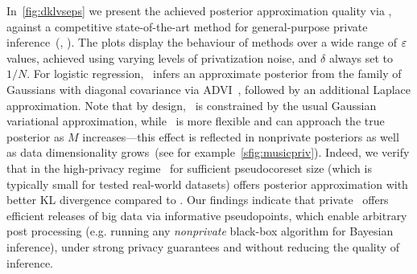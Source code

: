 In~\cref{fig:dklvseps} we present the achieved posterior approximation quality via \dpsvi, against a competitive state-of-the-art method for general-purpose private inference~(\dpvi, \cite{jalko17}). The plots display the
behaviour of methods over a wide range of $\varepsilon$ values, achieved using varying levels of privatization noise, and $\delta$ always set to $1/N$. For logistic regression, \dpvi~infers an approximate posterior from the family of Gaussians with diagonal covariance via ADVI~\citep{kucukelbir17}, followed by an additional Laplace approximation. Note that by design, \dpvi~is constrained by the usual Gaussian variational approximation, while \dpsvi~is more flexible and can approach the true posterior as $ M $ increases---this effect is reflected in nonprivate posteriors as well as data dimensionality grows~(see for example~\cref{sfig:musicpriv}). Indeed, we verify that in the high-privacy regime \dpsvi~for sufficient pseudocoreset size (which is typically small for tested real-world datasets) offers posterior approximation with better KL divergence compared to \dpvi. Our findings indicate that private \psvi~offers efficient releases of big data via informative pseudopoints, which enable arbitrary post processing (e.g. running any \emph{nonprivate} black-box algorithm for Bayesian inference), under strong privacy guarantees and without reducing the quality of inference.







